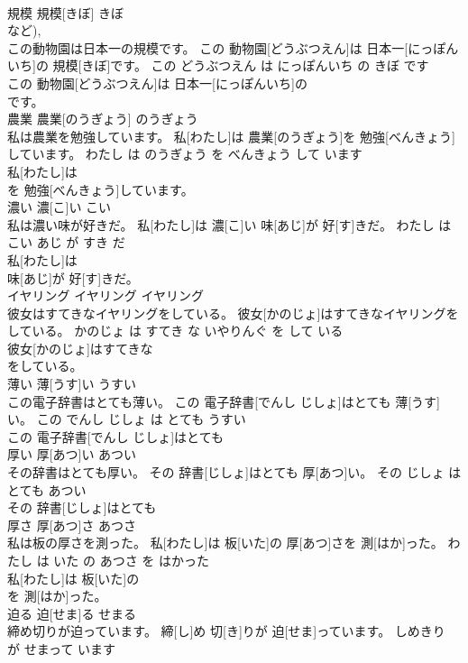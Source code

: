 \documentclass[8pt]{extreport}
\begin{document}
\begin{CJK}{UTF8}{min}
\\	規模	規模[きぼ]	きぼ	
\\	など), 
\\	この動物園は日本一の規模です。	この 動物園[どうぶつえん]は 日本一[にっぽんいち]の 規模[きぼ]です。	この どうぶつえん は にっぽんいち の きぼ です	
\\	この 動物園[どうぶつえん]は 日本一[にっぽんいち]の
\\	です。		
\\	農業	農業[のうぎょう]	のうぎょう	
\\	私は農業を勉強しています。	私[わたし]は 農業[のうぎょう]を 勉強[べんきょう]しています。	わたし は のうぎょう を べんきょう して います	
\\	私[わたし]は
\\	を 勉強[べんきょう]しています。		
\\	濃い	濃[こ]い	こい	
\\	私は濃い味が好きだ。	私[わたし]は 濃[こ]い 味[あじ]が 好[す]きだ。	わたし は こい あじ が すき だ	
\\	私[わたし]は
\\	味[あじ]が 好[す]きだ。		
\\	イヤリング	イヤリング	イヤリング	
\\	彼女はすてきなイヤリングをしている。	彼女[かのじょ]はすてきなイヤリングをしている。	かのじょ は すてき な いやりんぐ を して いる	
\\	彼女[かのじょ]はすてきな
\\	をしている。		
\\	薄い	薄[うす]い	うすい	
\\	この電子辞書はとても薄い。	この 電子辞書[でんし じしょ]はとても 薄[うす]い。	この でんし じしょ は とても うすい	
\\	この 電子辞書[でんし じしょ]はとても
\\	厚い	厚[あつ]い	あつい	
\\	その辞書はとても厚い。	その 辞書[じしょ]はとても 厚[あつ]い。	その じしょ は とても あつい	
\\	その 辞書[じしょ]はとても
\\	厚さ	厚[あつ]さ	あつさ	
\\	私は板の厚さを測った。	私[わたし]は 板[いた]の 厚[あつ]さを 測[はか]った。	わたし は いた の あつさ を はかった	
\\	私[わたし]は 板[いた]の
\\	を 測[はか]った。		
\\	迫る	迫[せま]る	せまる	
\\	締め切りが迫っています。	締[し]め 切[き]りが 迫[せま]っています。	しめきり が せまって います	

\end{CJK}
\end{document}
